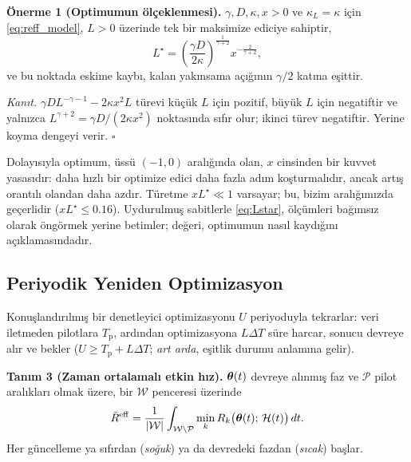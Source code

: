 \textbf{Önerme 1 (Optimumun ölçeklenmesi).} $\gamma, D, \kappa, x > 0$ ve $\kappa_L=\kappa$ için \eqref{eq:reff_model}, $L>0$ üzerinde tek bir maksimize ediciye sahiptir,
\begin{equation}
    L^\star = \left(\frac{\gamma D}{2\kappa}\right)^{\frac{1}{\gamma+2}} x^{-\frac{2}{\gamma+2}} ,
    \label{eq:Lstar}
\end{equation}
ve bu noktada eskime kaybı, kalan yakınsama açığının $\gamma/2$ katına eşittir.

\emph{Kanıt.} $\gamma D L^{-\gamma-1} - 2\kappa x^2 L$ türevi küçük $L$ için pozitif, büyük $L$ için negatiftir ve yalnızca $L^{\gamma+2}=\gamma D/(2\kappa x^2)$ noktasında sıfır olur; ikinci türev negatiftir. Yerine koyma dengeyi verir. \hfill$\square$

Dolayısıyla optimum, üssü $(-1,0)$ aralığında olan, $x$ cinsinden bir kuvvet yasasıdır: daha hızlı bir optimize edici daha fazla adım koşturmalıdır, ancak artış orantılı olandan daha azdır. Türetme $xL^\star \ll 1$ varsayar; bu, bizim aralığımızda geçerlidir ($xL^\star\le 0.16$). Uydurulmuş sabitlerle \eqref{eq:Lstar}, ölçümleri bağımsız olarak öngörmek yerine betimler; değeri, optimumun nasıl kaydığını açıklamasındadır.

\subsection{Periyodik Yeniden Optimizasyon}
Konuşlandırılmış bir denetleyici optimizasyonu $U$ periyoduyla tekrarlar: veri iletmeden pilotlara $T_{\mathrm{p}}$, ardından optimizasyona $L\Delta T$ süre harcar, sonucu devreye alır ve bekler ($U \ge T_{\mathrm{p}}+L\Delta T$; \emph{art arda}, eşitlik durumu anlamına gelir).

\textbf{Tanım 3 (Zaman ortalamalı etkin hız).} $\boldsymbol{\theta}(t)$ devreye alınmış faz ve $\mathcal{P}$ pilot aralıkları olmak üzere, bir $\mathcal{W}$ penceresi üzerinde
\begin{equation}
    \bar{R}^{\mathrm{eff}} = \frac{1}{|\mathcal{W}|}\int_{\mathcal{W}\setminus\mathcal{P}} \min_k R_k\big(\boldsymbol{\theta}(t);\,\mathcal{H}(t)\big)\,dt .
    \label{eq:time_avg}
\end{equation}
Her güncelleme ya sıfırdan (\emph{soğuk}) ya da devredeki fazdan (\emph{sıcak}) başlar.
